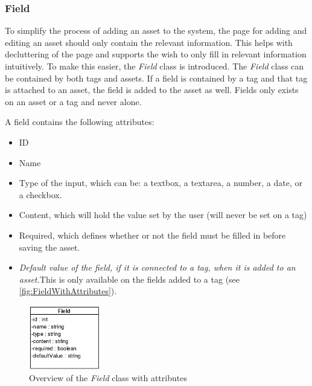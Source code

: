 \subsubsection{Field}
To simplify the process of adding an asset to the system, the page for adding and editing an asset should only contain the relevant information. This helps with decluttering of the page and supports the wish to only fill in relevant information intuitively. To make this easier, the \textit{Field} class is introduced. The \textit{Field} class can be contained by both tags and assets. If a field is contained by a tag and that tag is attached to an asset, the field is added to the asset as well. Fields only exists on an asset or a tag and never alone.
\par
A field contains the following attributes:
\begin{itemize}
    \item ID
    \item Name
    \item Type of the input, which can be: a textbox, a textarea, a number, a date, or a checkbox. 
    \item Content, which will hold the value set by the user (will never be set on a tag)
    \item Required, which defines whether or not the field must be filled in before saving the asset.
    \item \textit{Default value of the field, if it is connected to a tag, when it is added to an asset.}\newline This is only available on the fields added to a tag (see \autoref{fig:FieldWithAttributes}).
\end{itemize}
\begin{figure}[H]
    \centering
    \includegraphics[width=0.28\textwidth]{figures/Classes/FieldAttributes.png}
    \caption{Overview of the \textit{Field} class with attributes}
    \label{fig:FieldWithAttributes}
\end{figure}

